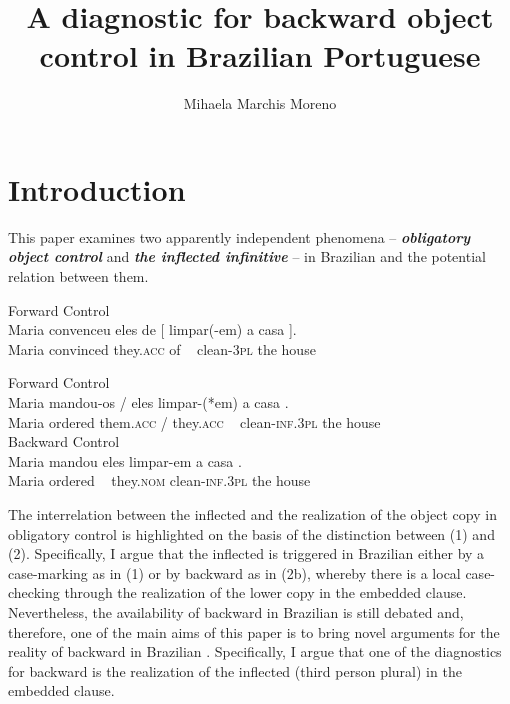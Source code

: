 \documentclass[output=paper]{langsci/langscibook}
\author{Mihaela Marchis Moreno\affiliation{FCSH, Universidade Nova de Lisboa}}
\title{A diagnostic for backward object control in Brazilian Portuguese}
\begin{document}
\section{Introduction}%
This paper examines two apparently independent phenomena – \textbf{\textit{obligatory object control}} and \textbf{\textit{the inflected infinitive} }– in Brazilian  and the potential relation between them.

\ea%
         Forward Control\label{ex:moreno:1}\\
    \gll Maria convenceu eles  de    [  limpar(-em)   a     casa ].\\
         Maria convinced they.\textsc{acc} of ~  clean-\textsc{3pl}  the house\\
\z

\ea\label{ex:moreno:2}%
    \ea  Forward Control\\
    \gll Maria  mandou-os                   /   eles        {\ob}  limpar-(*em) a     casa {\cb}.   \\
         Maria {ordered  them.\textsc{acc}} /   they.\textsc{acc}   ~   clean-\textsc{inf.3pl} the house\\
    \glt
    \ex  Backward Control\\
    \gll Maria mandou {\ob}    eles    limpar-em     a     casa {\cb}.\\
         Maria  ordered  ~  they.\textsc{nom}      clean-\textsc{inf.3pl}          the house\\
        \z
\z

The interrelation between the inflected  and the realization of the object copy in obligatory control is highlighted on the basis of the distinction between (1) and (2). Specifically, I argue that the inflected  is triggered in Brazilian  either by a case-marking  as in (1) or by backward  as in (2b), whereby there is a local case-checking through the realization of the lower copy in the embedded clause. Nevertheless, the availability of backward  in Brazilian  is still debated and, therefore, one of the main aims of this paper is to bring novel arguments for the reality of backward  in Brazilian . Specifically, I argue that one of the diagnostics for backward  is the realization of the inflected  (third person plural) in the embedded clause.
\end{document}
